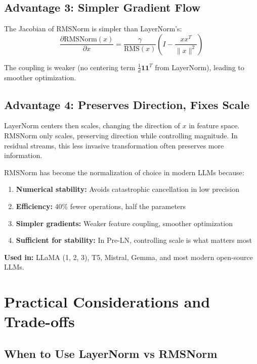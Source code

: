 \documentclass{article}
\begin{document}
\subsection{Advantage 3: Simpler Gradient Flow}

The Jacobian of RMSNorm is simpler than LayerNorm's:
\[
\frac{\partial \text{RMSNorm}(x)}{\partial x} = \frac{\gamma}{\text{RMS}(x)}\left(I - \frac{xx^T}{\|x\|^2}\right)
\]

The coupling is weaker (no centering term $\frac{1}{d}\mathbf{1}\mathbf{1}^T$ from LayerNorm), leading to smoother optimization.

\subsection{Advantage 4: Preserves Direction, Fixes Scale}

LayerNorm centers then scales, changing the direction of $x$ in feature space. RMSNorm only scales, preserving direction while controlling magnitude. In residual streams, this less invasive transformation often preserves more information.

\begin{tcolorbox}[colback=blue!5!white, colframe=blue!50!black, title=RMSNorm: The Modern Standard]
RMSNorm has become the normalization of choice in modern LLMs because:

\begin{enumerate}
\item \textbf{Numerical stability:} Avoids catastrophic cancellation in low precision
\item \textbf{Efficiency:} 40\% fewer operations, half the parameters
\item \textbf{Simpler gradients:} Weaker feature coupling, smoother optimization
\item \textbf{Sufficient for stability:} In Pre-LN, controlling scale is what matters most
\end{enumerate}

\textbf{Used in:} LLaMA (1, 2, 3), T5, Mistral, Gemma, and most modern open-source LLMs.
\end{tcolorbox}

\section{Practical Considerations and Trade-offs}

\subsection{When to Use LayerNorm vs RMSNorm}
\end{document}
